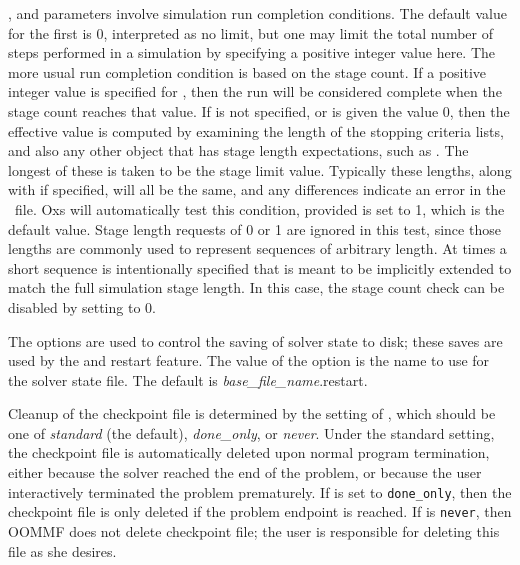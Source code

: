 \begin{description}
,  and
 parameters involve simulation run
completion conditions.  The default value for the first is 0,
interpreted as no limit, but one may limit the total number of steps
performed in a simulation by specifying a positive integer value here.
The more usual run completion condition is based on the stage count.  If
a positive integer value is specified for , then the
run will be considered complete when the stage count reaches that value.
If  is not specified, or is given the value 0, then the
effective  value is computed by examining the
length of the stopping criteria lists, and also any other 
object that has stage length expectations, such as
.  The longest of these is
taken to be the stage limit value.  Typically these lengths, along with
 if specified, will all be the same, and any
differences indicate an error in the \MIF\ file.  Oxs will automatically
test this condition, provided  is set to 1,
which is the default value.  Stage length requests of 0 or 1 are ignored
in this test, since those lengths are commonly used to represent
sequences of arbitrary length.  At times a short sequence is
intentionally specified that is meant to be implicitly extended to match
the full simulation stage length.  In this case, the stage count check
can be disabled by setting  to 0.

The %
options are used to control the saving of solver state to disk; these
saves are used by the  and  restart feature.
The value of the  option is the name to
use for the solver state file.  The default is
\textit{base\_file\_name}.restart.

Cleanup of the checkpoint file is determined by the setting of
, which should be one of
\textit{standard} (the default), \textit{done\_only}, or \textit{never}.
Under the standard setting, the checkpoint file is automatically deleted
upon normal program termination, either because the solver reached the end
of the problem, or because the user interactively terminated the problem
prematurely.  If  is set to
\texttt{done\_only}, then the checkpoint file is only deleted if the
problem endpoint is reached.  If  is
\texttt{never}, then OOMMF does not delete checkpoint file; the
user is responsible for deleting this file as she desires.


\end{description}

